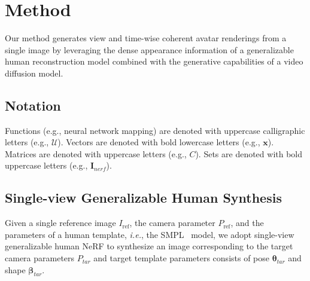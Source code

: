 \section{Method}
\label{sec:method}




Our method generates view and time-wise coherent avatar renderings from a single image by leveraging the dense appearance information of a generalizable human reconstruction model combined with the generative capabilities of a video diffusion model.

\subsection{Notation}
%
Functions (e.g., neural network mapping) are denoted with uppercase calligraphic letters (e.g., $\mathcal{U}$). Vectors are denoted with bold lowercase letters (e.g., $\bm{x}$). Matrices are denoted with uppercase letters (e.g., $C$). Sets are denoted with bold uppercase letters (e.g., $\bm{I}_{nerf}$).


\subsection{Single-view Generalizable Human Synthesis}
Given a single reference image $I_{\text{ref}}$, the camera parameter $P_\text{ref}$, and the parameters of a human template, \textit{i.e.}, the SMPL~\cite{loper2015smpl} model, we adopt single-view generalizable human NeRF \cite{hu2023sherf} to synthesize an image corresponding to the target camera parameters $P_{tar}$ and target template parameters consists of pose $\bm{\theta}_{tar}$ and shape $\bm{\beta}_{tar}$. %

